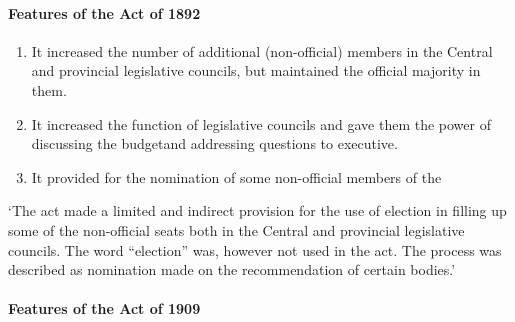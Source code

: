 \begin{multicols}{2}
\paragraph{Features of the Act of 1892}
\begin{enumerate}
  \item It increased the number of additional (non-official) members in the Central and provincial legislative councils, but maintained the official majority in them.
  \item It increased the function of legislative councils and gave them the power of discussing the budget\endnote and addressing questions to executive.
  \item It provided for the nomination of some non-official members of the
\end{enumerate}
`The act made a limited and indirect provision for the use of election in filling up some of the non-official seats both in the Central and provincial legislative councils. The word ``election'' was, however not used in the act. The process was described as nomination made on the recommendation of certain bodies\endnote.'

\paragraph{Features of the Act of 1909}


\end{multicols}
